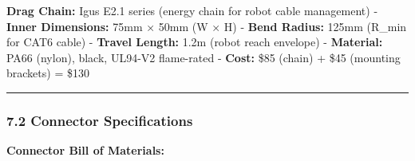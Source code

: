 \documentclass[
]{article}
\begin{document}
\textbf{Drag Chain:} Igus E2.1 series (energy chain for robot cable
management) - \textbf{Inner Dimensions:} 75mm × 50mm (W × H) -
\textbf{Bend Radius:} 125mm (R\_min for CAT6 cable) - \textbf{Travel
Length:} 1.2m (robot reach envelope) - \textbf{Material:} PA66 (nylon),
black, UL94-V2 flame-rated - \textbf{Cost:} \$85 (chain) + \$45
(mounting brackets) = \$130

\begin{center}\rule{0.5\linewidth}{0.5pt}\end{center}

\hypertarget{connector-specifications}{%
\subsubsection{7.2 Connector
Specifications}\label{connector-specifications}}

\textbf{Connector Bill of Materials:}
\end{document}
